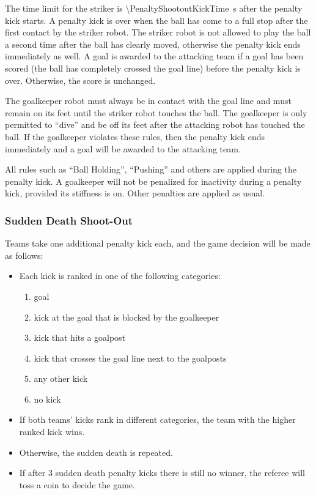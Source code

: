 The time limit for the striker is \qty{\PenaltyShootoutKickTime}{\second} after the penalty kick starts.
A penalty kick is over when the ball has come to a full stop after the first contact by the striker robot.
The striker robot is not allowed to play the ball a second time after the ball has clearly moved, otherwise the penalty kick ends immediately as well.
A goal is awarded to the attacking team if a goal has been scored (\ie the ball has completely crossed the goal line) before the penalty kick is over.
Otherwise, the score is unchanged.

The goalkeeper robot must always be in contact with the goal line and must remain on its feet until the striker robot touches the ball.
The goalkeeper is only permitted to ``dive'' and be off its feet after the attacking robot has touched the ball.
If the goalkeeper violates these rules, then the penalty kick ends immediately and a goal will be awarded to the attacking team.

All rules such as ``Ball Holding'', ``Pushing'' and others are applied during the penalty kick.
A goalkeeper will not be penalized for inactivity during a penalty kick, provided its stiffness is on.
Other penalties are applied as usual.

\subsubsection{Sudden Death Shoot-Out}
\label{sec:sudden_death_shoot_out}

Teams take one additional penalty kick each, and the game decision will be made as follows:
\begin{itemize}
  \item Each kick is ranked in one of the following categories:
  \begin{enumerate}
    \item goal
    \item kick at the goal that is blocked by the goalkeeper
    \item kick that hits a goalpost
    \item kick that crosses the goal line next to the goalposts
    \item any other kick
    \item no kick
  \end{enumerate}
  \item If both teams' kicks rank in different categories, the team with the higher ranked kick wins.
  \item Otherwise, the sudden death is repeated.
  \item If after 3 sudden death penalty kicks there is still no winner, the referee will toss a coin to decide the game.
\end{itemize}